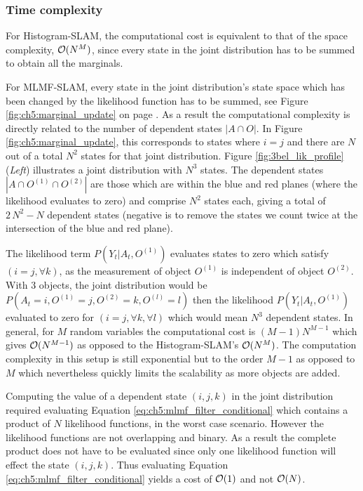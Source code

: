 \subsubsection{Time complexity}

For Histogram-SLAM, the computational cost is equivalent to that of the space complexity, $\operatorname{\mathcal{O}}(N^M)$,
since every state in the joint distribution has to be summed to obtain all the marginals.

For MLMF-SLAM, every state in the joint distribution's state space which has been changed by the likelihood function 
has to be summed, see Figure \ref{fig:ch5:marginal_update} on page \pageref{fig:ch5:marginal_update}. As a result the computational complexity is directly 
related to the number of dependent states $|A \cap O|$. In Figure \ref{fig:ch5:marginal_update}, this corresponds to states where $i = j$ and there are $N$ out 
of a total $N^2$ states for that joint distribution. Figure \ref{fig:3bel_lik_profile} (\textit{Left})
illustrates a joint distribution with $N^3$ states. The dependent states $|A \cap O^{(1)} \cap O^{(2)}|$ are those which 
are within the blue and red planes (where the likelihood evaluates to zero) and comprise $N^2$ states each, 
giving a total of $2\,N^2 - N$ dependent states (negative is to remove the states we count twice at the intersection of the blue and red plane). 

The likelihood term $P(Y_t|A_t,O^{(1)})$ evaluates states to zero which satisfy ${(i=j,\forall k)}$, as 
the measurement of object $O^{(1)}$ is independent of object $O^{(2)}$. With 3 objects, the joint distribution would be
${P(A_t=i,O^{(1)}=j,O^{(2)}=k,O^{(l)}=l)}$ then the likelihood $P(Y_t|A_t,O^{(1)})$  evaluated to 
zero for ${(i=j,\forall k,\forall l)}$ which would mean $N^3$ dependent states.
In general, for $M$ random variables the computational cost is $(M-1) N^{M-1}$ which gives $\operatorname{\mathcal{O}}(N^{M-1})$ as opposed to the Histogram-SLAM's $\operatorname{\mathcal{O}}(N^M)$. 
The computation complexity in this setup is still exponential but to the order $M-1$ as opposed to $M$ which nevertheless 
quickly limits the scalability as more objects are added. 

Computing the value of a dependent state ${(i,j,k)}$ in the joint distribution required evaluating Equation \ref{eq:ch5:mlmf_filter_conditional} which
contains a product of $N$ likelihood functions, in the worst case scenario. However the likelihood functions are not overlapping and binary. As a result the complete product
does not have to be evaluated since only one likelihood function will effect the state ${(i,j,k)}$. Thus evaluating Equation \ref{eq:ch5:mlmf_filter_conditional}
yields a cost of $\operatorname{\mathcal{O}}(1)$ and not $\operatorname{\mathcal{O}}(N)$.

